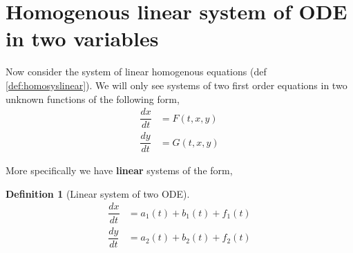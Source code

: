 \documentclass[oneside,11pt,pdftex,final]{book}%
\numberwithin{equation}{section}
\newtheorem{example}[theorem]{Example}
\newtheorem{definition}[theorem]{Definition}
\numberwithin{section}{chapter}
\numberwithin{equation}{chapter}
\begin{document}
%









\section{Homogenous linear system of ODE in two variables}
Now consider the system of linear homogenous equations (def \ref{def:homosyslinear}).
We will only see systems of two first order equations in two unknown functions of the following form,
\begin{align*}
	\dfrac{dx}{dt}&=F(t,x,y)\\
	\dfrac{dy}{dt}&=G(t,x,y)
\end{align*}

More specifically we have \textbf{linear} systems of the form,

\begin{definition}[Linear system of two ODE]\label{def:syslinear}
	\begin{align*}
		\dfrac{dx}{dt}&=a_1(t)+b_1(t)+f_1(t)\\
		\dfrac{dy}{dt}&=a_2(t)+b_2(t)+f_2(t)
	\end{align*}
\end{definition}
\end{document}
